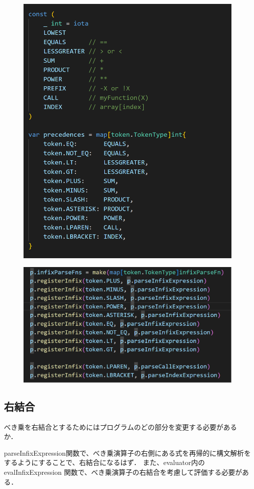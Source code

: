 \documentclass[fleqn, a4paper. 12pt]{ltjsarticle}
\begin{document}
\begin{figure}[h]
    \centering
    \includegraphics[width=0.5\linewidth]{images/2_par_1.png}
    \label{fig:example}
\end{figure}

\begin{figure}[h]
    \centering
    \includegraphics[width=0.5\linewidth]{images/2_par_2.png}
    \label{fig:example}
\end{figure}

\subsection{右結合}
べき乗を右結合とするためにはプログラムのどの部分を変更する必要がある
か．

parseInfixExpression関数で、べき乗演算子の右側にある式を再帰的に構文解析をするようにすることで、右結合になるはず．
また、evaluator内の evalInfixExpression 関数で、べき乗演算子の右結合を考慮して評価する必要がある．
\end{document}
